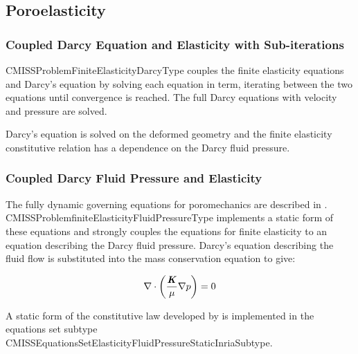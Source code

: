 \subsection{Poroelasticity}

\subsubsection{Coupled Darcy Equation and Elasticity with Sub-iterations}

CMISSProblemFiniteElasticityDarcyType couples the finite elasticity equations and
Darcy's equation by solving each equation in term, iterating between the two equations
until convergence is reached. The full Darcy equations with velocity and pressure
are solved.

Darcy's equation is solved on the deformed geometry and the finite elasticity
constitutive relation has a dependence on the Darcy fluid pressure.

\subsubsection{Coupled Darcy Fluid Pressure and Elasticity}

The fully dynamic governing equations for poromechanics are described in \cite{coussy:2004}.
CMISSProblemfiniteElasticityFluidPressureType implements a static form of these equations
and strongly couples the equations
for finite elasticity to an equation describing the Darcy fluid pressure. Darcy's
equation describing the fluid flow is substituted into the mass conservation
equation to give:

\begin{equation}
\divergence{}{\pbrac{\dfrac{\tensor{K}}{\mu} \gradient{}{p}}} = 0
\end{equation}

A static form of the constitutive law developed by \cite{chapelle:2010} is implemented in the equations
set subtype CMISSEquationsSetElasticityFluidPressureStaticInriaSubtype.
